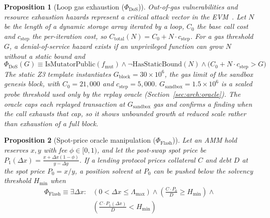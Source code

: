\documentclass[pdflatex,sn-mathphys]{sn-jnl}
\theoremstyle{thmstyleone}
\newtheorem{proposition}{Proposition}
\theoremstyle{thmstyletwo}
\begin{document}
\begin{proposition}[Loop gas exhaustion ($\Phi_{\mathrm{DoS}}$)]\label{prop:dos}
Out-of-gas vulnerabilities and resource exhaustion hazards represent a critical attack vector in the EVM~\cite{grech2018madmax,albert2020gasol,perez2021broken}. Let $N$ be the length of a dynamic storage array iterated by a loop, $C_0$ the base call cost and $c_{\mathrm{step}}$ the per-iteration cost, so $C_{\mathrm{total}}(N) = C_0 + N \cdot c_{\mathrm{step}}$. For a gas threshold $G$, a denial-of-service hazard exists if an unprivileged function can grow $N$ without a static bound and
\begin{equation}
    \Phi_{\mathrm{DoS}}(G) \equiv \mathrm{IsMutatorPublic}(f_{\mathrm{mut}}) \land \neg \mathrm{HasStaticBound}(N) \land \big( C_0 + N \cdot c_{\mathrm{step}} > G \big)
\end{equation}
The static Z3 template instantiates $G_{\mathrm{block}} = 30 \times 10^6$, the gas limit of the sandbox genesis block, with $C_0 = 21{,}000$ and $c_{\mathrm{step}} = 5{,}000$. $G_{\mathrm{sandbox}} = 1.5 \times 10^6$ is a scaled probe threshold used only by the replay oracle (Section~\ref{sec:arch:oracle}). The oracle caps each replayed transaction at $G_{\mathrm{sandbox}}$ gas and confirms a finding when the call exhausts that cap, so it shows unbounded growth at reduced scale rather than exhaustion of a full block.
\end{proposition}

\begin{proposition}[Spot-price oracle manipulation ($\Phi_{\mathrm{Flash}}$)]\label{prop:flash}
Let an AMM hold reserves $x, y$ with fee $\phi \in [0,1)$, and let the post-swap spot price be $P_1(\Delta x) = \frac{x + \Delta x (1-\phi)}{y - \Delta y}$. If a lending protocol prices collateral $C$ and debt $D$ at the spot price $P_0 = x/y$, a position solvent at $P_0$ can be pushed below the solvency threshold $H_{\mathrm{min}}$ when
\begin{equation}
\begin{aligned}
    \Phi_{\mathrm{Flash}} \equiv \exists \Delta x : {} & (0 < \Delta x \le \Lambda_{\mathrm{max}}) \land \left( \tfrac{C \cdot P_0}{D} \ge H_{\mathrm{min}} \right) \land {} \\
    & \left( \tfrac{C \cdot P_1(\Delta x)}{D} < H_{\mathrm{min}} \right)
\end{aligned}
\end{equation}
\end{proposition}
\end{document}
